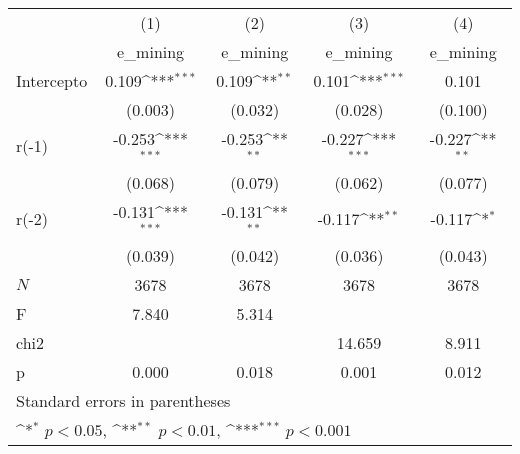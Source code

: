 {
\def\sym#1{\ifmmode^{#1}\else\(^{#1}\)\fi}
\begin{longtable}{l*{4}{c}}
\hline\hline\endfirsthead\hline\endhead\hline\endfoot\endlastfoot
            &\multicolumn{1}{c}{(1)}&\multicolumn{1}{c}{(2)}&\multicolumn{1}{c}{(3)}&\multicolumn{1}{c}{(4)}\\
            &\multicolumn{1}{c}{e\_mining}&\multicolumn{1}{c}{e\_mining}&\multicolumn{1}{c}{e\_mining}&\multicolumn{1}{c}{e\_mining}\\
\hline
Intercepto  &       0.109\sym{***}&       0.109\sym{**} &       0.101\sym{***}&       0.101         \\
            &     (0.003)         &     (0.032)         &     (0.028)         &     (0.100)         \\
r(-1)       &      -0.253\sym{***}&      -0.253\sym{**} &      -0.227\sym{***}&      -0.227\sym{**} \\
            &     (0.068)         &     (0.079)         &     (0.062)         &     (0.077)         \\
r(-2)       &      -0.131\sym{***}&      -0.131\sym{**} &      -0.117\sym{**} &      -0.117\sym{*}  \\
            &     (0.039)         &     (0.042)         &     (0.036)         &     (0.043)         \\
\hline
\(N\)       &        3678         &        3678         &        3678         &        3678         \\
F           &       7.840         &       5.314         &                     &                     \\
chi2        &                     &                     &      14.659         &       8.911         \\
p           &       0.000         &       0.018         &       0.001         &       0.012         \\
\hline\hline
\multicolumn{5}{l}{\footnotesize Standard errors in parentheses}\\
\multicolumn{5}{l}{\footnotesize \sym{*} \(p<0.05\), \sym{**} \(p<0.01\), \sym{***} \(p<0.001\)}\\
\end{longtable}
}
